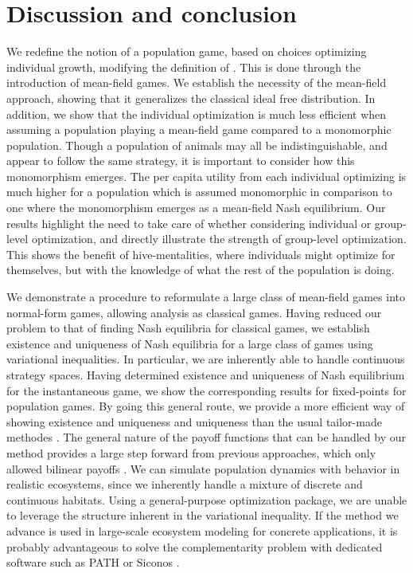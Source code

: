 \section{Discussion and conclusion}


We redefine the notion of a population game, based on choices optimizing individual growth, modifying the definition of \citep{vincent2005evolutionary}. This is done through the introduction of mean-field games. We establish the necessity of the mean-field approach, showing that it generalizes the classical ideal free distribution. In addition, we show that the individual optimization is much less efficient when assuming a population playing a mean-field game compared to a monomorphic population. Though a population of animals may all be indistinguishable, and appear to follow the same strategy, it is important to consider how this monomorphism emerges. The per capita utility from each individual optimizing is much higher for a population which is assumed monomorphic in comparison to one where the monomorphism emerges as a mean-field Nash equilibrium. Our results highlight the need to take care of whether considering individual or group-level optimization, and directly illustrate the strength of group-level optimization. This shows the benefit of hive-mentalities, where individuals might optimize for themselves, but with the knowledge of what the rest of the population is doing.


We demonstrate a procedure to reformulate a large class of mean-field games into normal-form games, allowing analysis as classical games. Having reduced our problem to that of finding Nash equilibria for classical games, we establish existence and uniqueness of Nash equilibria for a large class of games using variational inequalities. In particular, we are inherently able to handle continuous strategy spaces. Having determined existence and uniqueness of Nash equilibrium for the instantaneous game, we show the corresponding results for fixed-points for population games. By going this general route, we provide a more efficient way of showing existence and uniqueness and uniqueness than the usual tailor-made methodes \citep{cressman2010ideal,kvrivan2009evolutionary}. The general nature of the payoff functions that can be handled by our method provides a large step forward from previous approaches, which only allowed bilinear payoffs \citep{mariani2016migration, pinti2021co}. We can simulate population dynamics with behavior in realistic ecosystems, since we inherently handle a mixture of discrete and continuous habitats. Using a general-purpose optimization package, we are unable to leverage the structure inherent in the variational inequality. If the method we advance is used in large-scale ecosystem modeling for concrete applications, it is probably advantageous to solve the complementarity problem with dedicated software such as PATH or Siconos \citep{dirkse1995path, acary2019introduction}.


